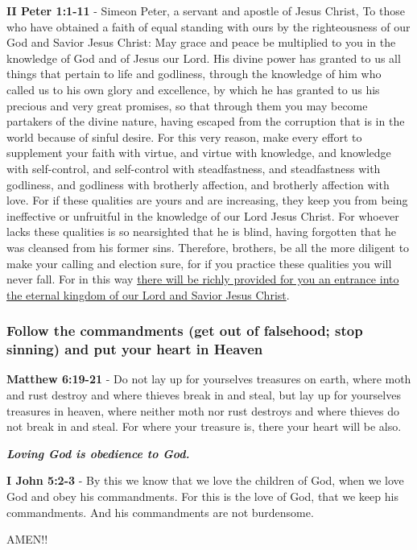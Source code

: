 \documentclass[11pt]{article}
\begin{document}
\textbf{II Peter 1:1-11} - Simeon Peter, a servant and apostle of Jesus Christ, To those who have obtained a faith of equal standing with ours by the righteousness of our God and Savior Jesus Christ: May grace and peace be multiplied to you in the knowledge of God and of Jesus our Lord.  His divine power has granted to us all things that pertain to life and godliness, through the knowledge of him who called us to his own glory and excellence, by which he has granted to us his precious and very great promises, so that through them you may become partakers of the divine nature, having escaped from the corruption that is in the world because of sinful desire.  For this very reason, make every effort to supplement your faith with virtue, and virtue with knowledge, and knowledge with self-control, and self-control with steadfastness, and steadfastness with godliness, and godliness with brotherly affection, and brotherly affection with love.  For if these qualities are yours and are increasing, they keep you from being ineffective or unfruitful in the knowledge of our Lord Jesus Christ.  For whoever lacks these qualities is so nearsighted that he is blind, having forgotten that he was cleansed from his former sins.  Therefore, brothers, be all the more diligent to make your calling and election sure, for if you practice these qualities you will never fall.  For in this way \uline{there will be richly provided for you an entrance into the eternal kingdom of our Lord and Savior Jesus Christ}.

\subsubsection{Follow the commandments (get out of falsehood; stop sinning) and put your heart in Heaven}
\label{sec:org068718f}
\textbf{Matthew 6:19-21} - Do not lay up for yourselves treasures on earth, where moth and rust destroy and where thieves break in and steal, but lay up for yourselves treasures in heaven, where neither moth nor rust destroys and where thieves do not break in and steal. For where your treasure is, there your heart will be also.

\emph{\textbf{Loving God is obedience to God.}}

\textbf{I John 5:2-3} - By this we know that we love the children of God, when we love God and obey his commandments. For this is the love of God, that we keep his commandments. And his commandments are not burdensome.

AMEN!!
\end{document}
